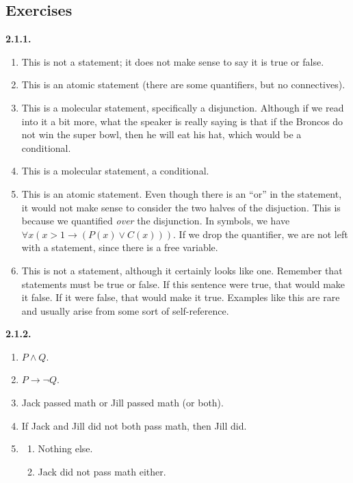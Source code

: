 \documentclass[10pt,]{book}
\theoremstyle{plain}
\theoremstyle{definition}
\theoremstyle{definition}
\theoremstyle{definition}
\theoremstyle{definition}
\numberwithin{equation}{chapter}
\newcommand{\imp}{\rightarrow}
\begin{document}
\subsection*{ Exercises}
\noindent\textbf{2.1.1.} \hypertarget{p-1097}{}%
\leavevmode%
\begin{enumerate}[label=(\alph*)]
\item\hypertarget{li-525}{}This is not a statement; it does not make sense to say it is true or false.%
\item\hypertarget{li-526}{}This is an atomic statement (there are some quantifiers, but no connectives).%
\item\hypertarget{li-527}{}This is a molecular statement, specifically a disjunction.  Although if we read into it a bit more, what the speaker is really saying is that if the Broncos do not win the super bowl, then he will eat his hat, which would be a conditional.%
\item\hypertarget{li-528}{}This is a molecular statement, a conditional.%
\item\hypertarget{li-529}{}This is an atomic statement.  Even though there is an ``or'' in the statement, it would not make sense to consider the two halves of the disjuction.  This is because we quantified \emph{over} the disjunction.  In symbols, we have \(\forall x (x > 1 \imp (P(x) \vee C(x)))\).  If we drop the quantifier, we are not left with a statement, since there is a free variable.%
\item\hypertarget{li-530}{}This is not a statement, although it certainly looks like one.  Remember that statements must be true or false.  If this sentence were true, that would make it false.  If it were false, that would make it true.  Examples like this are rare and usually arise from some sort of self-reference.%
\end{enumerate}
%
\par\smallskip
\noindent\textbf{2.1.2.} \hypertarget{p-1104}{}%
\leavevmode%
\begin{enumerate}[label=(\alph*)]
\item\hypertarget{li-538}{}\(P \wedge Q\).%
\item\hypertarget{li-539}{}\(P \imp \neg Q\).%
\item\hypertarget{li-540}{}\hypertarget{p-1105}{}%
Jack passed math or Jill passed math (or both).%
\item\hypertarget{li-541}{}\hypertarget{p-1106}{}%
If Jack and Jill did not both pass math, then Jill did.%
\item\hypertarget{li-542}{}\hypertarget{p-1107}{}%
%
\begin{enumerate}[label=\roman*.]
\item\hypertarget{li-543}{}Nothing else.%
\item\hypertarget{li-544}{}Jack did not pass math either.%
\end{enumerate}
%
\end{enumerate}
\end{document}
